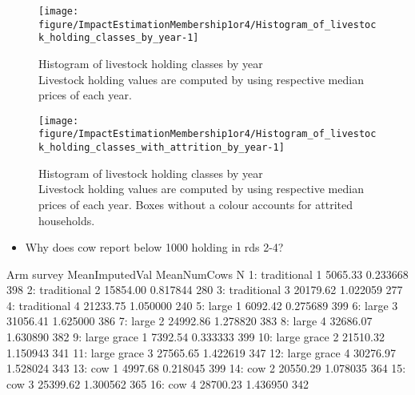 \begin{Schunk}
\begin{figure}

{\centering \texttt{[image: figure/ImpactEstimationMembership1or4/Histogram\_of\_livestock\_holding\_classes\_by\_year-1]} 

}

\caption{Histogram of livestock holding classes by year\\ {\footnotesize Livestock holding values are computed by using respective median prices of each year.\setlength{\baselineskip}{8pt}}}\label{Figure Histogram of livestock holding classes by year}
\end{figure}
\end{Schunk}
\begin{Schunk}
\begin{figure}

{\centering \texttt{[image: figure/ImpactEstimationMembership1or4/Histogram\_of\_livestock\_holding\_classes\_with\_attrition\_by\_year-1]} 

}

\caption{Histogram of livestock holding classes by year\\ {\footnotesize Livestock holding values are computed by using respective median prices of each year. Boxes without a colour accounts for attrited households.\setlength{\baselineskip}{8pt}}}\label{Figure Histogram of livestock holding classes with attrition by year}
\end{figure}
\end{Schunk}
\begin{itemize}
\vspace{1.0ex}\setlength{\itemsep}{1.0ex}\setlength{\baselineskip}{12pt}
\item	Why does \textsf{cow} report below 1000 holding in rds 2-4?
\end{itemize}
\begin{Schunk}
\begin{Soutput}
            Arm survey MeanImputedVal MeanNumCows   N
 1: traditional      1        5065.33    0.233668 398
 2: traditional      2       15854.00    0.817844 280
 3: traditional      3       20179.62    1.022059 277
 4: traditional      4       21233.75    1.050000 240
 5:       large      1        6092.42    0.275689 399
 6:       large      3       31056.41    1.625000 386
 7:       large      2       24992.86    1.278820 383
 8:       large      4       32686.07    1.630890 382
 9: large grace      1        7392.54    0.333333 399
10: large grace      2       21510.32    1.150943 341
11: large grace      3       27565.65    1.422619 347
12: large grace      4       30276.97    1.528024 343
13:         cow      1        4997.68    0.218045 399
14:         cow      2       20550.29    1.078035 364
15:         cow      3       25399.62    1.300562 365
16:         cow      4       28700.23    1.436950 342
\end{Soutput}
\end{Schunk}
